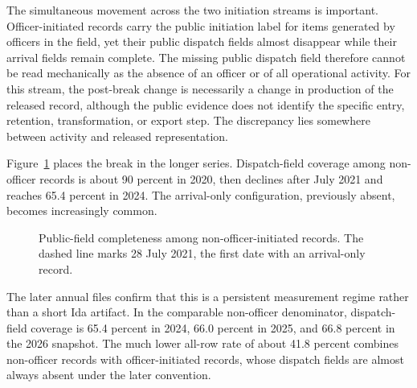 \documentclass[11pt]{article}
\begin{document}
The simultaneous movement across the two initiation streams is important. Officer-initiated records carry the public initiation label for items generated by officers in the field, yet their public dispatch fields almost disappear while their arrival fields remain complete. The missing public dispatch field therefore cannot be read mechanically as the absence of an officer or of all operational activity. For this stream, the post-break change is necessarily a change in production of the released record, although the public evidence does not identify the specific entry, retention, transformation, or export step. The discrepancy lies somewhere between activity and released representation.

Figure~\ref{fig:monthly} places the break in the longer series. Dispatch-field coverage among non-officer records is about 90 percent in 2020, then declines after July 2021 and reaches 65.4 percent in 2024. The arrival-only configuration, previously absent, becomes increasingly common.

\begin{figure}[!htbp]
\centering
{}
\caption{Public-field completeness among non-officer-initiated records. The dashed line marks 28 July 2021, the first date with an arrival-only record.}
\label{fig:monthly}
\end{figure}

The later annual files confirm that this is a persistent measurement regime rather than a short Ida artifact. In the comparable non-officer denominator, dispatch-field coverage is 65.4 percent in 2024, 66.0 percent in 2025, and 66.8 percent in the 2026 snapshot. The much lower all-row rate of about 41.8 percent combines non-officer records with officer-initiated records, whose dispatch fields are almost always absent under the later convention.
\end{document}
